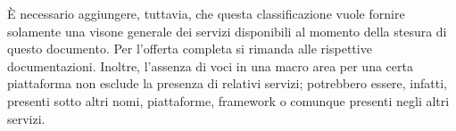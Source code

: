 È necessario aggiungere, tuttavia, che questa classificazione vuole fornire solamente una visone generale dei servizi disponibili al momento della stesura
di questo documento.
Per l'offerta completa si rimanda alle rispettive documentazioni. Inoltre, l'assenza di voci in una macro area per una certa piattaforma non esclude la presenza di relativi servizi; potrebbero essere, infatti, presenti sotto altri nomi, piattaforme, framework o comunque presenti negli altri servizi.
%
\begin{sidewaystable}
\centering
\caption{Tabella riassuntiva dei servizi offerti, raggruppati per macro aree.}
\label{tab:macro-aree}
{\footnotesize
{}}
\end{sidewaystable}
